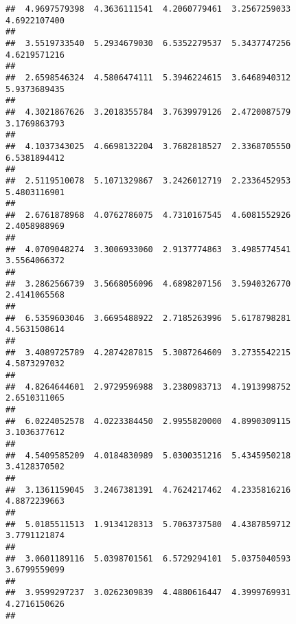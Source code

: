 \documentclass[]{article}
\begin{document}
\begin{verbatim}
##  4.9697579398  4.3636111541  4.2060779461  3.2567259033  4.6922107400 
##                                                                       
##  3.5519733540  5.2934679030  6.5352279537  5.3437747256  4.6219571216 
##                                                                       
##  2.6598546324  4.5806474111  5.3946224615  3.6468940312  5.9373689435 
##                                                                       
##  4.3021867626  3.2018355784  3.7639979126  2.4720087579  3.1769863793 
##                                                                       
##  4.1037343025  4.6698132204  3.7682818527  2.3368705550  6.5381894412 
##                                                                       
##  2.5119510078  5.1071329867  3.2426012719  2.2336452953  5.4803116901 
##                                                                       
##  2.6761878968  4.0762786075  4.7310167545  4.6081552926  2.4058988969 
##                                                                       
##  4.0709048274  3.3006933060  2.9137774863  3.4985774541  3.5564066372 
##                                                                       
##  3.2862566739  3.5668056096  4.6898207156  3.5940326770  2.4141065568 
##                                                                       
##  6.5359603046  3.6695488922  2.7185263996  5.6178798281  4.5631508614 
##                                                                       
##  3.4089725789  4.2874287815  5.3087264609  3.2735542215  4.5873297032 
##                                                                       
##  4.8264644601  2.9729596988  3.2380983713  4.1913998752  2.6510311065 
##                                                                       
##  6.0224052578  4.0223384450  2.9955820000  4.8990309115  3.1036377612 
##                                                                       
##  4.5409585209  4.0184830989  5.0300351216  5.4345950218  3.4128370502 
##                                                                       
##  3.1361159045  3.2467381391  4.7624217462  4.2335816216  4.8872239663 
##                                                                       
##  5.0185511513  1.9134128313  5.7063737580  4.4387859712  3.7791121874 
##                                                                       
##  3.0601189116  5.0398701561  6.5729294101  5.0375040593  3.6799559099 
##                                                                       
##  3.9599297237  3.0262309839  4.4880616447  4.3999769931  4.2716150626 
##                                                                       

\end{verbatim}
\end{document}
